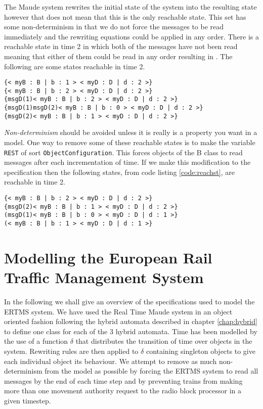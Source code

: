 The Maude system rewrites the initial state of the system into the resulting state however that does not mean that this is the only reachable state. This set has some non-determinism in that we do not force the messages to be read immediately and the rewriting equations could be applied in any order. There is a reachable state in time 2 in which both of the messages have not been read meaning that either of them could be read in any order resulting in  . 
The following are some states reachable in time 2.

\begin{lstlisting}[caption = Some of the states reachable by rewriting EXAMPLE1 in two time steps, label = code:reachst ]
{< myB : B | b : 1 > < myD : D | d : 2 >}
{< myB : B | b : 2 > < myD : D | d : 2 >}
{msgD(1)< myB : B | b : 2 > < myD : D | d : 2 >}
{msgD(1)msgD(2)< myB : B | b : 0 > < myD : D | d : 2 >}
{msgD(2)< myB : B | b : 1 > < myD : D | d : 2 >}
\end{lstlisting}

\emph{Non-determinism} should be avoided unless it is really is a property you want in a model. One way to remove some of these reachable states is to make the variable \texttt{REST} of sort \texttt{ObjectConfiguration}. This forces objects of the B class to read messages after each incrementation of time. If we make this modification to the specification then the following states, from code listing \ref{code:reachst}, are reachable in time 2.
\medskip
\begin{lstlisting}[caption = States reachable by the modified EXAMPLE1 in two time steps]
{< myB : B | b : 2 > < myD : D | d : 2 >}
{msgD(2)< myB : B | b : 1 > < myD : D | d : 2 >}
(msgD(1)< myB : B | b : 0 > < myD : D | d : 1 >}
(< myB : B | b : 1 > < myD : D | d : 1 >}
\end{lstlisting}

\section{Modelling the European Rail Traffic Management System}
In the following we shall give an overview of the specifications used to model the ERTMS system. We have used the Real Time Maude system in an object oriented fashion following the hybrid automata described in chapter \ref{chap:hybrid} to define one class for each of the 3 hybrid automata. Time has been modelled by the use of a function $\delta$ that distributes the transition of time over objects in the system. Rewriting rules are then applied to $\delta$ containing singleton objects to give each individual object its behaviour. We attempt to remove as much non-determinism from the model as possible by forcing the ERTMS system to read all messages by the end of each time step and by preventing trains from making more than one movement authority request to the radio block processor in a given timestep.


